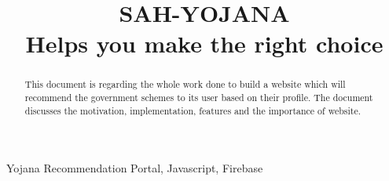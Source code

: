 \documentclass[conference]{IEEEtran}
\makeatletter
\newcommand{\linebreakand}{%
  \end{@IEEEauthorhalign}
  \hfill\mbox{}\par
  \mbox{}\hfill\begin{@IEEEauthorhalign}
}
\makeatother
\begin{document}
\title{SAH-YOJANA \\
\large {Helps you make the right choice}
}


\author{
\and
{}
}

\maketitle
\begin{abstract}
This document is regarding the whole work done to
build a website which will recommend the government schemes to its user based on their profile. The document discusses the motivation, implementation, features and the importance of website.\\
\end{abstract}
\begin{IEEEkeywords}
Yojana Recommendation Portal, Javascript, Firebase
\end{IEEEkeywords}
\end{document}
